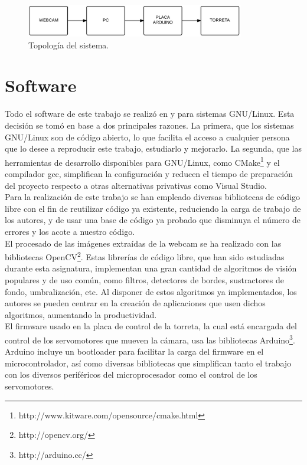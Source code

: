 \begin{figure}[h]
\centering
\includegraphics[width=0.85\textwidth]{images/topologia}%
\caption{Topología del sistema.}
\label{topologia}
\end{figure}
\FloatBarrier

\newpage

\section{Software}
Todo el software de este trabajo se realizó en y para sistemas GNU/Linux. Esta decisión se tomó en base a dos principales razones. La primera, que los sistemas GNU/Linux son de código abierto, lo que facilita el acceso a cualquier persona que lo desee a reproducir este trabajo, estudiarlo y mejorarlo. La segunda, que las herramientas de desarrollo disponibles para GNU/Linux, como CMake\footnote{http://www.kitware.com/opensource/cmake.html} y el compilador gcc, simplifican la configuración y reducen el tiempo de preparación del proyecto respecto a otras alternativas privativas como Visual Studio.\\

Para la realización de este trabajo se han empleado diversas bibliotecas de código libre con el fin de reutilizar código ya existente, reduciendo la carga de trabajo de los autores, y de usar una base de código ya probado que disminuya el número de errores y los acote a nuestro código.\\

El procesado de las imágenes extraídas de la webcam se ha realizado con las bibliotecas OpenCV\footnote{http://opencv.org/}. Estas librerías de código libre, que han sido estudiadas durante esta asignatura, implementan una gran cantidad de algoritmos de visión populares y de uso común, como filtros, detectores de bordes, sustractores de fondo, umbralización, etc. Al disponer de estos algoritmos ya implementados, los autores se pueden centrar  en la creación de aplicaciones que usen dichos algoritmos, aumentando la productividad.\\

El firmware usado en la placa de control de la torreta, la cual está encargada del control de los servomotores que mueven la cámara, usa las bibliotecas Arduino\footnote{http://arduino.cc/}. Arduino incluye un bootloader para facilitar la carga del firmware en el microcontrolador, así como diversas bibliotecas que simplifican tanto el trabajo con los diversos periféricos del microprocesador como el control de los servomotores.\\

